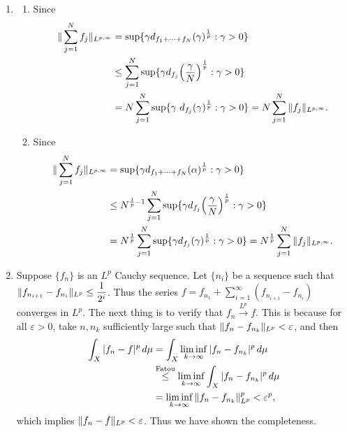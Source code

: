 \begin{enumerate}
\item[1.1.7.]
    \begin{enumerate}
    \item[(a)] Since
    \begin{equation*}\begin{aligned}
    \norm{\sum_{j=1}^{N}f_{j}}_{L^{p,\infty}}&=\sup\{\gamma d_{f_{1}+\cdots+f_{N}}(\gamma)^{\frac{1}{p}}:\gamma>0\} \\
    &\leq \sum_{j=1}^{N}\sup\{\gamma d_{f_{j}}\Big(\frac{\gamma}{N}\Big)^{\frac{1}{p}}:\gamma>0\} \\
    &= N\sum_{j=1}^{N}\sup\{\gamma\ d_{f_{j}}(\gamma)^{\frac{1}{p}}:\gamma>0\}
    = N\sum_{j=1}^{N}\norm{f_{j}}_{L^{p,\infty}}.
    \end{aligned}\end{equation*}

    \item[(b)] Since
    \begin{equation*}\begin{aligned}
    \Vert \sum_{j=1}^{N}f_{j} \Vert_{L^{p,\infty}}&=\sup\{\gamma d_{f_{1}+\cdots+f_{N}}(\alpha)^{\frac{1}{p}}:\gamma>0\} \\
    &\leq N^{\frac{1}{p}-1}\sum_{j=1}^{N}\sup\{\gamma d_{f_{j}}\Big(\frac{\gamma}{N}\Big)^{\frac{1}{p}}:\gamma>0\} \\
    &= N^{\frac{1}{p}}\sum_{j=1}^{N}\sup\{\gamma d_{f_{j}}(\gamma)^{\frac{1}{p}}:\gamma>0\}
    = N^{\frac{1}{p}}\sum_{j=1}^{N}\Vert f_{j} \Vert_{L^{p,\infty}}.
    \end{aligned}\end{equation*}
    \end{enumerate}

\item[1.1.8.]
    Suppose $\{f_{n}\}$ is an $L^{p}$ Cauchy sequence. 
    Let $\{n_{i}\}$ be a sequence such that 
    $\Vert f_{n_{i+1}}-f_{n_{i}} \Vert_{L^p} \leq \dfrac{1}{2^{i}}$. 
    Thus the series $f = f_{n_{1}}+\sum_{i=1}^{\infty}(f_{n_{i+1}}-f_{n_{i}})$ 
    converges in $L^{p}$. 
    The next thing is to verify that $f_{n} \overset{L^{p}}{\longrightarrow} f$. 
    This is because for all $\varepsilon>0$, 
    take $n,n_k$ sufficiently large such that $\Vert f_{n}-f_{n_{k}} \Vert_{L^p}<\varepsilon$, and then
    \begin{equation*}\begin{aligned}
    \int_{X}|f_{n}-f|^{p}\,d\mu &= \int_{X}\liminf_{k \rightarrow \infty}|f_{n}-f_{n_{k}}|^{p}\,d\mu \\
    &\overset{\text{Fatou}}{\leq} \liminf_{k \rightarrow \infty}\int_{X}|f_{n}-f_{n_{k}}|^{p}\,d\mu \\
    &= \liminf_{k \rightarrow \infty} \Vert f_{n}-f_{n_{k}} \Vert_{L^p}^{p} < \varepsilon^{p},
    \end{aligned}\end{equation*}
    which implies $\Vert f_{n}-f \Vert_{L^p}<\varepsilon$. 
    Thus we have shown the completeness.


\end{enumerate}
